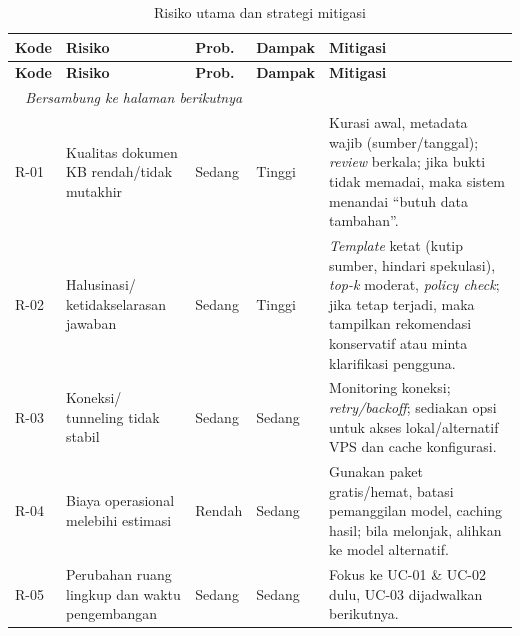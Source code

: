 \begin{longtable}{|p{1.5cm}|p{2.5cm}|p{1.8cm}|p{1.8cm}|p{6cm}|}
\caption{Risiko utama dan strategi mitigasi}
\label{tbl:Risiko Mitigasi} \\
\hline
\textbf{Kode} & \textbf{Risiko} & \textbf{Prob.} & \textbf{Dampak} & \textbf{Mitigasi} \\
\hline
\endfirsthead

\hline
\textbf{Kode} & \textbf{Risiko} & \textbf{Prob.} & \textbf{Dampak} & \textbf{Mitigasi} \\
\hline
\endhead

\hline
\multicolumn{3}{r}{\textit{Bersambung ke halaman berikutnya}} \\
\endfoot

\hline
\endlastfoot
R-01 & Kualitas dokumen KB rendah/tidak mutakhir & Sedang & Tinggi & Kurasi awal, metadata wajib (sumber/tanggal); \textit{review} berkala; jika bukti tidak memadai, maka sistem menandai ``butuh data tambahan''. \\ \hline
R-02 & Halusinasi/ ketidakselarasan jawaban & Sedang & Tinggi & \textit{Template} ketat (kutip sumber, hindari spekulasi), \textit{top-k} moderat, \textit{policy check}; jika tetap terjadi, maka tampilkan rekomendasi konservatif atau minta klarifikasi pengguna. \\ \hline
R-03 & Koneksi/ tunneling tidak stabil & Sedang & Sedang & Monitoring koneksi; \textit{retry/backoff}; sediakan opsi untuk akses lokal/alternatif VPS dan cache konfigurasi. \\ \hline
R-04 & Biaya operasional melebihi estimasi & Rendah & Sedang & Gunakan paket gratis/hemat, batasi pemanggilan model, caching hasil; bila melonjak, alihkan ke model alternatif. \\ \hline
R-05 & Perubahan ruang lingkup dan waktu pengembangan & Sedang & Sedang & Fokus ke UC-01 \& UC-02 dulu, UC-03 dijadwalkan berikutnya. \\ \hline
\end{longtable}

